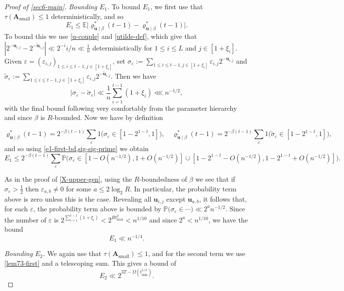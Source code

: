 \documentclass[11pt,reqno]{amsart}
\numberwithin{equation}{section}
\theoremstyle{definition}
\theoremstyle{remark}
\newcommand{\mb}{\mathbb}
\newcommand{\mbf}{\mathbf}
\newcommand{\eps}{\varepsilon}
\renewcommand{\le}{\leqslant}
\def\sml{\operatorname{small}}
\begin{document}
\begin{proof}[Proof of \cref{sec6-main}]
\emph{Bounding $E_1$.}
To bound $E_1$, we first use that $\tau(\mbf{A}_{\sml}) \le 1$ deterministically, and so
\begin{equation}\label{e1-first-bd}  E_1 \le \mb{E} \big| \varrho^*_{\tilde{\mbf{u}} \mid \beta}(t-1) - \varrho^*_{\mbf{u} \mid \beta}(t-1)\big|.\end{equation}
To bound this we use \cref{u-couple} and \cref{utilde-def}, which give that $|2^{-\mbf{u}_{i,j}} - 2^{-\tilde{\mbf{u}}_{i,j}}| \ll 2^{-i}i/n \ll \frac{1}{n}$ deterministically for $1 \le i \le L$ and $j \in [1 + \xi_i]$. Given $\eps = (\eps_{i,j})_{1 \le i \le t-1, j \in [1 + \xi_i]}$, set $\sigma_{\eps} := \sum_{1 \le i \le t - 1, j \in [1 + \xi_i]} \eps_{i,j} 2^{-\mbf{u}_{i,j}}$ and $\tilde{\sigma}_{\eps} := \sum_{1 \le i \le t-1, j \in [1 + \xi_i]} \eps_{i,j} 2^{-\tilde{\mbf{u}}_{i,j}}$. Then we have
\begin{equation}\label{sig-sig-prime} \big| \sigma_{\eps} - \tilde\sigma_{\eps}\big| \ll \frac{1}{n} \sum_{i = 1}^{t-1} (1 + \xi_i) \lll n^{-1/2}, \end{equation} with the final bound following very comfortably from the parameter hierarchy and since $\beta$ is $R$-bounded. Now we have by definition

\[ \varrho^*_{\mbf{u} \mid \beta}(t-1 ) = 2^{-\beta(t-1)} \sum_{\eps} 1\big(\sigma_{\eps} \in [1 - 2^{1-t},1]), \quad \varrho^*_{\tilde{\mbf{u}} \mid \beta}(t-1 ) = 2^{-\beta(t-1)} \sum_{\eps} 1\big(\tilde{\sigma}_{\eps} \in [1 - 2^{1-t},1]),\]
and so using \cref{e1-first-bd,sig-sig-prime} we obtain
\[ E_1 \le 2^{-\beta(t-1)} \sum_{\eps} \mb{P}(\sigma_{\eps} \in [1 - O( n^{-1/2}), 1 + O(n^{-1/2})] \cup [1 - 2^{1 - t} - O(n^{-1/2}), 1 - 2^{1 - t} + O(n^{-1/2})]\big).\]

As in the proof of \cref{X-upper-gen}, using the $R$-boundedness of $\beta$ we see that if $\sigma_{\eps} > \frac{1}{2}$ then $\eps_{a,b} \ne 0$ for some $a \le 2 \log_2 R$. In particular, the probability term above is zero unless this is the case.
Revealing all $\mbf{u}_{i,j}$ except $\mbf{u}_{a,b}$, it follows that, for each $\eps$, the probability term above is bounded by $\mb{P}(\sigma_{\eps} \in \cdots\big) \ll 2^{a} n^{-1/2}$. Since the number of $\eps$ is $2^{\sum_{i =1}^{t-1} (1 + \xi_i)} < 2^{R t_{\max}^2} < n^{1/10}$ and since $2^a < n^{1/10}$, we have the bound \begin{equation}\label{e1-bd} E_1 \ll n^{-1/4}.\end{equation} 

\emph{Bounding $E_2$.} We again use that $\tau(\mbf{A}_{\sml}) \le 1$, and for the second term we use \cref{lem73-first} and a telescoping sum. This gives a bound of \begin{equation}\label{e2-bound} E_2 \ll  2^{3T - \Omega(t_{\min}^{1/4})}.\end{equation}


\end{proof}
\end{document}
